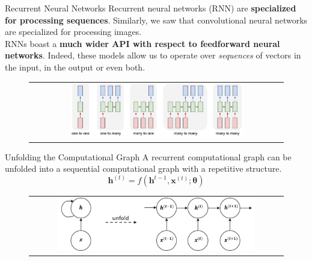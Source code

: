 \documentclass[aspectratio=169]{beamer}
\begin{document}

\begin{frame}{Recurrent Neural Networks}
Recurrent neural networks (RNN) are \textbf{specialized for processing sequences}. Similarly, we saw that convolutional neural networks are specialized for processing images.\\
\vspace{0.4cm}
RNNs boast a \textbf{much wider API with respect to feedforward neural networks}. Indeed, these models allow us to operate over \textit{sequences} of vectors in the input, in the output or even both.
\begin{figure}
\begin{tabular}{c}
\includegraphics[width=0.7\textwidth]{img/rnn/rnn_api.jpg}
\end{tabular}
\end{figure}
\end{frame}


\begin{frame}{Unfolding the Computational Graph}
A recurrent computational graph can be unfolded into a sequential computational graph with a repetitive structure.
\begin{equation*}
\bm{h}^{(t)} = f(\bm{h}^{t-1}, \bm{x}^{(t)}; \bm{\theta})
\end{equation*}
\begin{figure}
\begin{tabular}{c}
\includegraphics[width=0.8\textwidth]{img/rnn/rnn_unfold.png}
\end{tabular}
\end{figure}
\begin{columns}
\end{columns}
\end{frame}
\end{document}
